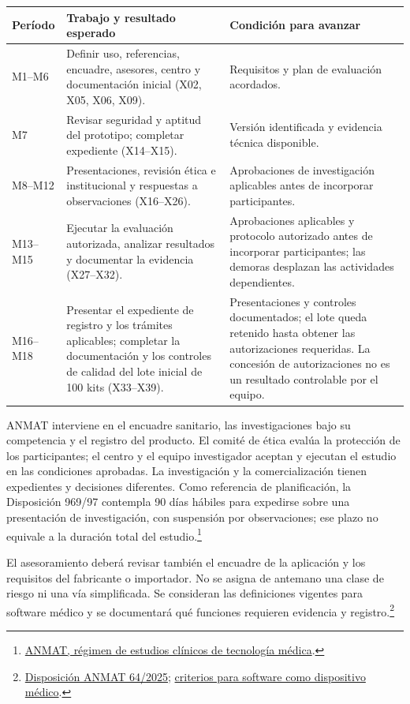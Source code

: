 \begin{center}\small\begin{tabularx}{\linewidth}{l X X}\toprule
Período & Trabajo y resultado esperado & Condición para avanzar\\\midrule
M1--M6 & Definir uso, referencias, encuadre, asesores, centro y documentación inicial (X02, X05, X06, X09). & Requisitos y plan de evaluación acordados.\\
M7 & Revisar seguridad y aptitud del prototipo; completar expediente (X14--X15). & Versión identificada y evidencia técnica disponible.\\
M8--M12 & Presentaciones, revisión ética e institucional y respuestas a observaciones (X16--X26). & Aprobaciones de investigación aplicables antes de incorporar participantes.\\
M13--M15 & Ejecutar la evaluación autorizada, analizar resultados y documentar la evidencia (X27--X32). & Aprobaciones aplicables y protocolo autorizado antes de incorporar participantes; las demoras desplazan las actividades dependientes.\\
M16--M18 & Presentar el expediente de registro y los trámites aplicables; completar la documentación y los controles de calidad del lote inicial de 100 kits (X33--X39). & Presentaciones y controles documentados; el lote queda retenido hasta obtener las autorizaciones requeridas. La concesión de autorizaciones no es un resultado controlable por el equipo.\\\bottomrule
\end{tabularx}\end{center}

ANMAT interviene en el encuadre sanitario, las investigaciones bajo su competencia y el registro del producto. El comité de ética evalúa la protección de los participantes; el centro y el equipo investigador aceptan y ejecutan el estudio en las condiciones aprobadas. La investigación y la comercialización tienen expedientes y decisiones diferentes. Como referencia de planificación, la Disposición 969/97 contempla 90 días hábiles para expedirse sobre una presentación de investigación, con suspensión por observaciones; ese plazo no equivale a la duración total del estudio.\footnote{\href{https://www.argentina.gob.ar/normativa/nacional/disposici\%C3\%B3n-969-1997-42205/actualizacion}{ANMAT, régimen de estudios clínicos de tecnología médica}.}

El asesoramiento deberá revisar también el encuadre de la aplicación y los requisitos del fabricante o importador. No se asigna de antemano una clase de riesgo ni una vía simplificada. Se consideran las definiciones vigentes para software médico y se documentará qué funciones requieren evidencia y registro.\footnote{\href{https://www.argentina.gob.ar/normativa/nacional/disposici\%C3\%B3n-64-2025-408309/texto}{Disposición ANMAT 64/2025}; \href{https://www.argentina.gob.ar/noticias/anmat-actualiza-los-criterios-regulatorios-para-software-como-dispositivo-medico-samd}{criterios para software como dispositivo médico}.}

